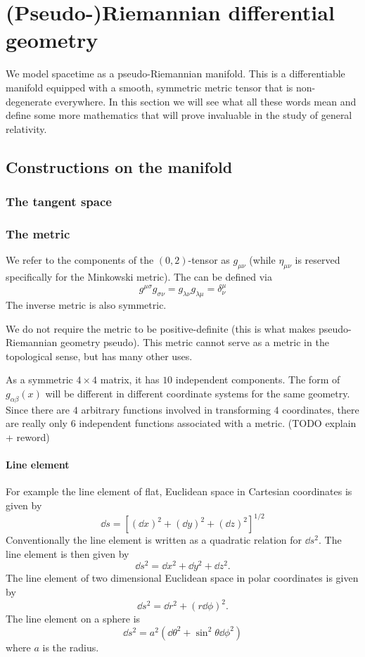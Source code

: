\chapter{(Pseudo-)Riemannian differential geometry}
We model spacetime as a pseudo-Riemannian manifold. This is a differentiable manifold equipped with a smooth, symmetric metric tensor that is non-degenerate everywhere. In this section we will see what all these words mean and define some more mathematics that will prove invaluable in the study of general relativity.

\section{Constructions on the manifold}
\subsection{The tangent space}

\subsection{The metric}
We refer to the components of the $(0,2)$-tensor as $g_{\mu\nu}$ (while $\eta_{\mu\nu}$ is reserved specifically for the Minkowski metric). The  can be defined via
\[ g^{\mu\sigma}g_{\sigma\nu} = g_{\lambda\nu}g_{\lambda\mu} = \delta^{\mu}_{\nu} \]
The inverse metric is also symmetric.

We do not require the metric to be positive-definite (this is what makes pseudo-Riemannian geometry pseudo). This metric cannot serve as a metric in the topological sense, but has many other uses. 

As a symmetric $4\times 4$ matrix, it has $10$ independent components. The form of $g_{\alpha\beta}(x)$ will be different in different coordinate systems for the same geometry. Since there are $4$ arbitrary functions involved in transforming $4$ coordinates, there are really only $6$ independent functions associated with a metric. (TODO explain + reword)

\subsubsection{Line element}
For example the line element of flat, Euclidean space in Cartesian coordinates is given by
\[ \dd{s} = \left[(\dd{x})^2 + (\dd{y})^2 + (\dd{z})^2\right]^{1/2} \]
Conventionally the line element is written as a quadratic relation for $\dd{s}^2$. 
The line element is then given by
\[ \dd{s}^2 = \dd{x}^2 + \dd{y}^2 + \dd{z}^2.  \]
The line element of two dimensional Euclidean space in polar coordinates is given by
\[ \dd{s}^2 = \dd{r}^2 + (r \dd{\phi})^2. \]
The line element on a sphere is
\[ \dd{s}^2 = a^2 \left(\dd{\theta}^2 + \sin^2\theta \dd{\phi}^2\right) \]
where $a$ is the radius.

